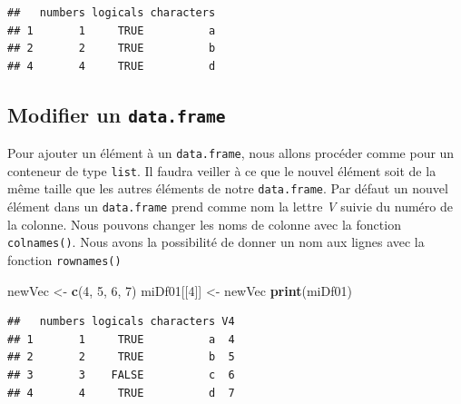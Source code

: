 \documentclass[twoside,symmetric]{book}
\newenvironment{Shaded}{}{}
\newcommand{\DecValTok}[1]{#1}
\newcommand{\KeywordTok}[1]{\textbf{#1}}
\newcommand{\NormalTok}[1]{#1}
\newcommand{\OperatorTok}[1]{#1}
\newcommand{\OtherTok}[1]{#1}
\newcommand{\StringTok}[1]{#1}
\begin{document}
\begin{Shaded}
\end{Shaded}

\begin{verbatim}
##   numbers logicals characters
## 1       1     TRUE          a
## 2       2     TRUE          b
## 4       4     TRUE          d
\end{verbatim}

\hypertarget{modifier-un-data.frame}{%
\subsection{\texorpdfstring{Modifier un \texttt{data.frame}}{Modifier un data.frame}}\label{modifier-un-data.frame}}

Pour ajouter un élément à un \texttt{data.frame}, nous allons procéder comme pour un conteneur de type \texttt{list}. Il faudra veiller à ce que le nouvel élément soit de la même taille que les autres éléments de notre \texttt{data.frame}. Par défaut un nouvel élément dans un \texttt{data.frame} prend comme nom la lettre \emph{V} suivie du numéro de la colonne. Nous pouvons changer les noms de colonne avec la fonction \texttt{colnames()}. Nous avons la possibilité de donner un nom aux lignes avec la fonction \texttt{rownames()}

\begin{Shaded}
\begin{Highlighting}[]
\NormalTok{newVec <-}\StringTok{ }\KeywordTok{c}\NormalTok{(}\DecValTok{4}\NormalTok{, }\DecValTok{5}\NormalTok{, }\DecValTok{6}\NormalTok{, }\DecValTok{7}\NormalTok{)}
\NormalTok{miDf01[[}\DecValTok{4}\NormalTok{]] <-}\StringTok{ }\NormalTok{newVec}
\KeywordTok{print}\NormalTok{(miDf01)}
\end{Highlighting}
\end{Shaded}

\begin{verbatim}
##   numbers logicals characters V4
## 1       1     TRUE          a  4
## 2       2     TRUE          b  5
## 3       3    FALSE          c  6
## 4       4     TRUE          d  7
\end{verbatim}
\end{document}
